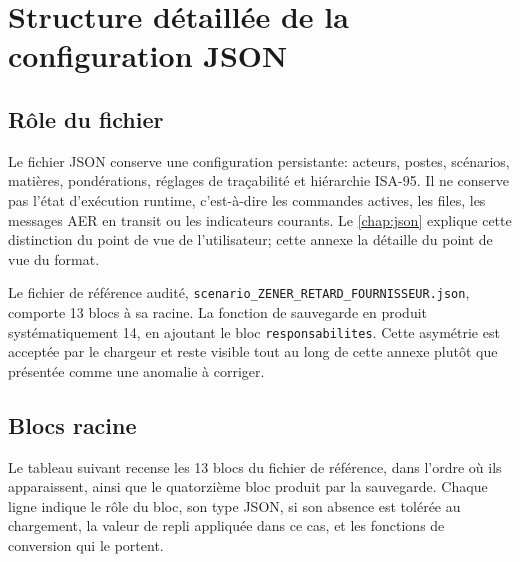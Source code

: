 \chapter{Structure détaillée de la configuration JSON}
\label{ann:structure-json}

\section{Rôle du fichier}

Le fichier JSON conserve une configuration persistante: acteurs, postes, scénarios, matières, pondérations, réglages de traçabilité et hiérarchie ISA-95. Il ne conserve pas l'état d'exécution runtime, c'est-à-dire les commandes actives, les files, les messages AER en transit ou les indicateurs courants. Le \cref{chap:json} explique cette distinction du point de vue de l'utilisateur; cette annexe la détaille du point de vue du format.

Le fichier de référence audité, \texttt{scenario\_ZENER\_RETARD\_FOURNISSEUR.json}, comporte 13 blocs à sa racine. La fonction de sauvegarde en produit systématiquement 14, en ajoutant le bloc \texttt{responsabilites}. Cette asymétrie est acceptée par le chargeur et reste visible tout au long de cette annexe plutôt que présentée comme une anomalie à corriger.

\section{Blocs racine}

Le tableau suivant recense les 13 blocs du fichier de référence, dans l'ordre où ils apparaissent, ainsi que le quatorzième bloc produit par la sauvegarde. Chaque ligne indique le rôle du bloc, son type JSON, si son absence est tolérée au chargement, la valeur de repli appliquée dans ce cas, et les fonctions de conversion qui le portent.

